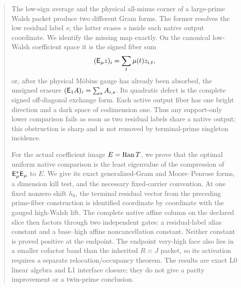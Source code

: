 \begin{abstract}
The low-sign average and the physical all-minus corner of a
large-prime Walsh packet produce two different Gram forms.  The former
resolves the low residual label \(s\); the latter erases \(s\) inside each
native output coordinate.  We identify the missing map exactly.  On the
canonical low-Walsh coefficient space it is the signed fiber sum
\[
 (\Eop_\mu z)_i=\sum_t\mu(t)z_{i,t},
\]
or, after the physical M\"obius gauge has already been absorbed, the
unsigned erasure \((\Eop_1A)_i=\sum_sA_{i,s}\).  Its quadratic defect is
the complete signed off-diagonal exchange form.  Each active output
fiber has one bright direction and a dark space of codimension one.
Thus any support-only lower comparison fails as soon as two residual
labels share a native output; this obstruction is sharp and is not
removed by terminal-prime singleton incidence.

For the actual coefficient image \(E=\Ran T\), we prove that the optimal
uniform native comparison is the least eigenvalue of the compression of
\(\Eop_\mu^*\Eop_\mu\) to \(E\).  We give its exact generalized-Gram and
Moore--Penrose forms, a dimension kill test, and the necessary
fixed-carrier convention.  At one fixed nonzero shift \(h_0\), the
terminal residual vector from the preceding prime-fiber construction is
identified coordinate by coordinate with the gauged high-Walsh lift.
The complete native affine column on the declared slice then factors through
two independent gates: a residual-label alias constant and a base--high
affine noncancellation constant.  Neither constant is proved positive at the
endpoint.  The endpoint very-high face also lies in a smaller cofactor band
than the inherited \(R\asymp J\) packet, so its activation requires a
separate relocation/occupancy theorem.  The results are exact L0 linear
algebra and L1 interface closure; they do not give a parity improvement or a
twin-prime conclusion.
\end{abstract}
